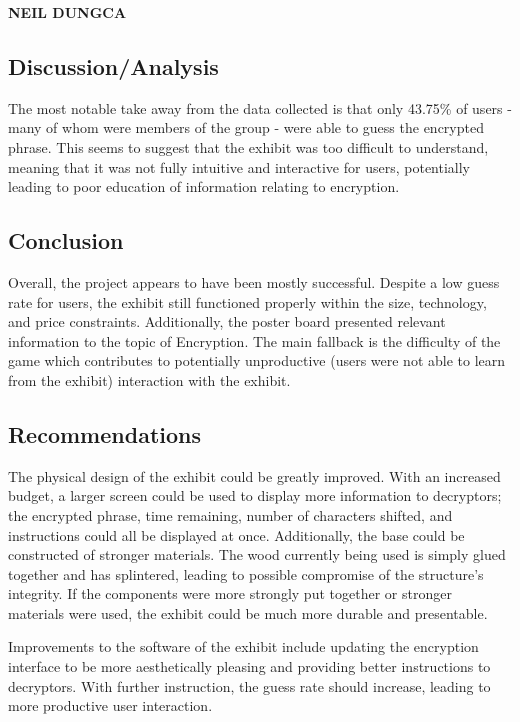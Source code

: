 \documentclass[conference]{IEEEtran}
\begin{document}
\newpage


\vspace{10pt} \LARGE \textbf{NEIL DUNGCA} \normalsize

\subsection{Discussion/Analysis}

\par The most notable take away from the data collected is that only 43.75\% of users - many of whom were members of the group - were able to guess the encrypted phrase.  This seems to suggest that the exhibit was too difficult to understand, meaning that it was not fully intuitive and interactive for users, potentially leading to poor education of information relating to encryption.

\subsection{Conclusion}

\par Overall, the project appears to have been mostly successful.  Despite a low guess rate for users, the exhibit still functioned properly within the size, technology, and price constraints.  Additionally, the poster board presented relevant information to the topic of Encryption.  The main fallback is the difficulty of the game which contributes to potentially unproductive (users were not able to learn from the exhibit) interaction with the exhibit.

\subsection{Recommendations}


\par The physical design of the exhibit could be greatly improved.  With an increased budget, a larger screen could be used to display more information to decryptors; the encrypted phrase, time remaining, number of characters shifted, and instructions could all be displayed at once.  Additionally, the base could be constructed of stronger materials.  The wood currently being used is simply glued together and has splintered, leading to possible compromise of the structure’s integrity.  If the components were more strongly put together or stronger materials were used, the exhibit could be much more durable and presentable.  
\par Improvements to the software of the exhibit include updating the encryption interface to be more aesthetically pleasing and providing better instructions to decryptors.  With further instruction, the guess rate should increase, leading to more productive user interaction. 
\end{document}
